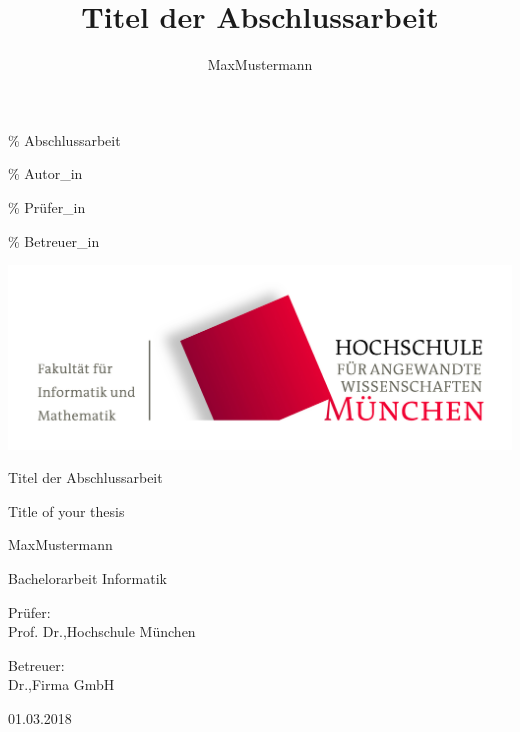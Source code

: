 \documentclass[listof=totoc,index=totoc,bibliography=totoc,12pt,german,a4paper,]{report}
\begin{document}
\% Abschlussarbeit \newcommand{\titel}{Titel der Abschlussarbeit}
\newcommand{\titelEN}{Title of your thesis}
\newcommand{\datum}{01.03.2018}

\% Autor\_in \newcommand{\aVorname}{Max}
\newcommand{\aNachname}{Mustermann}
\newcommand{\aGeburtsdatum}{01.04.1998}
\newcommand{\aInstitution}{Hochschule München}
\newcommand{\aStudiengruppe}{IF7} \newcommand{\aSemester}{WS 17/2018}
\newcommand{\aMatrikelnummer}{12345678}

\newcommand{\aName}{\aVorname\space\aNachname}

\% Prüfer\_in \newcommand{\pTitle}{Prof. Dr.} \newcommand{\pVorname}{}
\newcommand{\pNachname}{} \newcommand{\pInstitution}{Hochschule München}

\% Betreuer\_in \newcommand{\bTitle}{Dr.} \newcommand{\bVorname}{}
\newcommand{\bNachname}{} \newcommand{\bInstitution}{Firma GmbH}

\title{Titel der Abschlussarbeit}
\author{Max\space Mustermann}

\begin{titlepage}
    \begin{center}
        \includegraphics[width=1\textwidth]{style/hm-fk07_logo.jpg}

        \Large
        Titel der Abschlussarbeit
        
        \normalsize
        Title of your thesis

        \vspace{0.5cm}
        \Large
        Max\space Mustermann

        \normalsize
        Bachelorarbeit Informatik

        \vfill

        \normalsize
        Prüfer:\\
        Prof. Dr.\space\space,\space Hochschule München


        \normalsize
        Betreuer:\\
        Dr.\space\space,\space Firma GmbH

        01.03.2018

    \end{center}
\end{titlepage}
\end{document}

